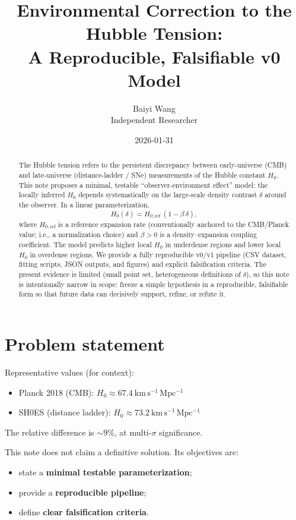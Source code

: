 \documentclass[11pt]{article}
\title{Environmental Correction to the Hubble Tension:\\A Reproducible, Falsifiable v0 Model}
\author{Baiyi Wang\\Independent Researcher}
\date{2026-01-31}
\begin{document}
\maketitle

\begin{abstract}
The Hubble tension refers to the persistent discrepancy between early-universe (CMB) and late-universe
(distance-ladder / SNe) measurements of the Hubble constant $H_0$.
This note proposes a minimal, testable ``observer-environment effect'' model:
the locally inferred $H_0$ depends systematically on the large-scale density contrast $\delta$
around the observer. In a linear parameterization,
\[
H_0(\delta)=H_{0,\mathrm{ref}}\,(1-\beta\,\delta),
\]
where $H_{0,\mathrm{ref}}$ is a reference expansion rate (conventionally anchored to the CMB/Planck value; i.e., a normalization choice) and $\beta>0$
is a density--expansion coupling coefficient. The model predicts higher local $H_0$ in underdense
regions and lower local $H_0$ in overdense regions.
We provide a fully reproducible v0/v1 pipeline (CSV dataset, fitting scripts, JSON outputs, and figures)
and explicit falsification criteria. The present evidence is limited (small point set, heterogeneous
definitions of $\delta$), so this note is intentionally narrow in scope:
freeze a simple hypothesis in a reproducible, falsifiable form so that future data can decisively
support, refine, or refute it.
\end{abstract}

\section{Problem statement}

Representative values (for context):
\begin{itemize}
  \item Planck 2018 (CMB): $H_0 \approx 67.4\ \mathrm{km\,s^{-1}\,Mpc^{-1}}$
  \item SH0ES (distance ladder): $H_0 \approx 73.2\ \mathrm{km\,s^{-1}\,Mpc^{-1}}$
\end{itemize}
The relative difference is $\sim 9\%$, at multi-$\sigma$ significance.

This note does not claim a definitive solution. Its objectives are:
\begin{itemize}
  \item state a \textbf{minimal testable parameterization};
  \item provide a \textbf{reproducible pipeline};
  \item define \textbf{clear falsification criteria}.
\end{itemize}
\end{document}
